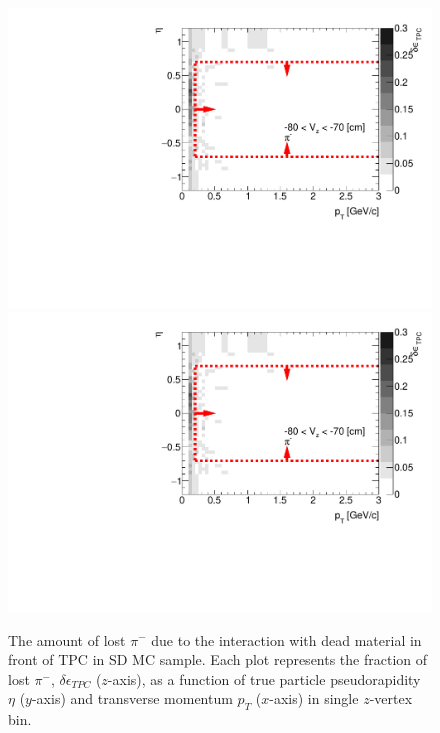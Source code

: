 \begin{figure}[H]
	\caption[The amount of lost $\pi^-$ due to the interaction with dead material in front of TPC as a function of $p_T$, $\eta$ and $z$-vertex in SD]{The amount of lost $\pi^-$ due to the interaction with dead material in front of TPC in SD MC sample. Each plot represents the fraction of lost $\pi^-$, $\delta\epsilon_{ TPC}$ ($z$-axis), as a function of true particle pseudorapidity $\eta$ ($y$-axis) and transverse momentum $p_{T}$ ($x$-axis) in single $z$-vertex bin.}\label{fig:dead_materialSD3Dpim}
	\parbox{0.325\textwidth}{
		\includegraphics[width=\linewidth,page=1]{graphics/systematicsEfficiency/deadMaterial/secondaries_Unbinned_SD_.pdf}\\
		\includegraphics[width=\linewidth,page=4]{graphics/systematicsEfficiency/deadMaterial/secondaries_Unbinned_SD_.pdf}\\
}
\end{figure}
